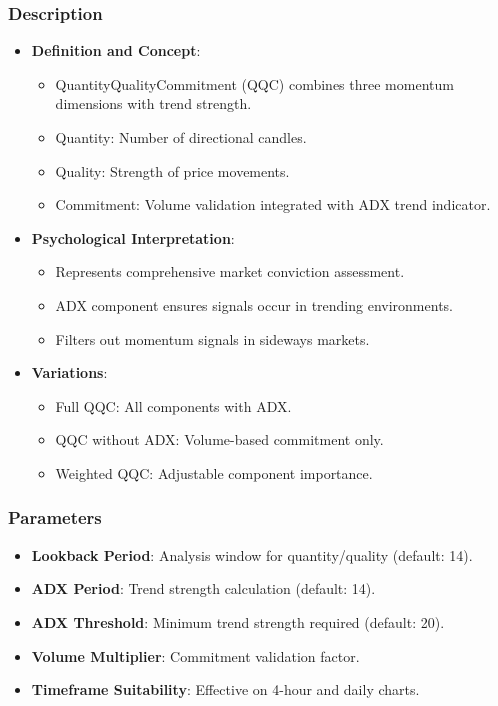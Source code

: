 \documentclass[12pt]{article}
\begin{document}
\subsubsection{Description}
\begin{itemize}
\item \textbf{Definition and Concept}:
  \begin{itemize}
  \item QuantityQualityCommitment (QQC) combines three momentum dimensions with trend strength.
  \item Quantity: Number of directional candles.
  \item Quality: Strength of price movements.
  \item Commitment: Volume validation integrated with ADX trend indicator.
  \end{itemize}
\item \textbf{Psychological Interpretation}:
  \begin{itemize}
  \item Represents comprehensive market conviction assessment.
  \item ADX component ensures signals occur in trending environments.
  \item Filters out momentum signals in sideways markets.
  \end{itemize}
\item \textbf{Variations}:
  \begin{itemize}
  \item Full QQC: All components with ADX.
  \item QQC without ADX: Volume-based commitment only.
  \item Weighted QQC: Adjustable component importance.
  \end{itemize}
\end{itemize}

\subsubsection{Parameters}
\begin{itemize}
\item \textbf{Lookback Period}: Analysis window for quantity/quality (default: 14).
\item \textbf{ADX Period}: Trend strength calculation (default: 14).
\item \textbf{ADX Threshold}: Minimum trend strength required (default: 20).
\item \textbf{Volume Multiplier}: Commitment validation factor.
\item \textbf{Timeframe Suitability}: Effective on 4-hour and daily charts.
\end{itemize}
\end{document}
